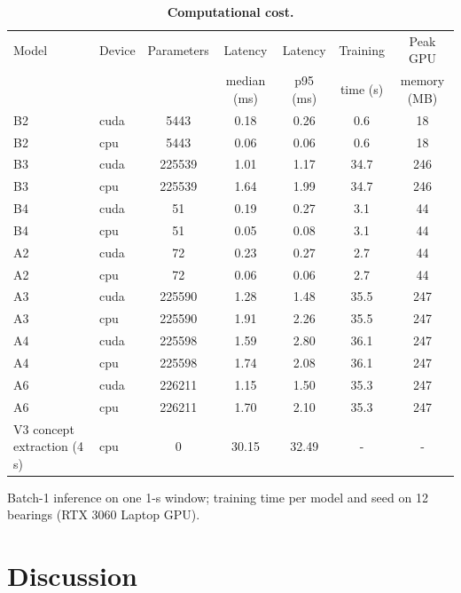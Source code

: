\documentclass[10pt,letterpaper]{article}
\begin{document}
\begin{table}[!ht]
\centering
\caption{\textbf{Computational cost.}}
{\footnotesize
\setlength{\tabcolsep}{4pt}
\renewcommand{\arraystretch}{1.25}
\begin{tabular}{llccccc}
\hline
Model & Device & Parameters & Latency & Latency & Training & Peak GPU \\
 & & & median (ms) & p95 (ms) & time (s) & memory (MB) \\
\hline
B2 & cuda & 5443 & 0.18 & 0.26 & 0.6 & 18 \\
B2 & cpu & 5443 & 0.06 & 0.06 & 0.6 & 18 \\
B3 & cuda & 225539 & 1.01 & 1.17 & 34.7 & 246 \\
B3 & cpu & 225539 & 1.64 & 1.99 & 34.7 & 246 \\
B4 & cuda & 51 & 0.19 & 0.27 & 3.1 & 44 \\
B4 & cpu & 51 & 0.05 & 0.08 & 3.1 & 44 \\
A2 & cuda & 72 & 0.23 & 0.27 & 2.7 & 44 \\
A2 & cpu & 72 & 0.06 & 0.06 & 2.7 & 44 \\
A3 & cuda & 225590 & 1.28 & 1.48 & 35.5 & 247 \\
A3 & cpu & 225590 & 1.91 & 2.26 & 35.5 & 247 \\
A4 & cuda & 225598 & 1.59 & 2.80 & 36.1 & 247 \\
A4 & cpu & 225598 & 1.74 & 2.08 & 36.1 & 247 \\
A6 & cuda & 226211 & 1.15 & 1.50 & 35.3 & 247 \\
A6 & cpu & 226211 & 1.70 & 2.10 & 35.3 & 247 \\
V3 concept extraction (4 s) & cpu & 0 & 30.15 & 32.49 & - & - \\
\hline
\end{tabular}}
\begin{flushleft} Batch-1 inference on one 1-s window; training time per model and seed on 12 bearings (RTX 3060 Laptop GPU). \end{flushleft}
\label{tab:efficiency}
\end{table}

\section*{Discussion}
\end{document}
